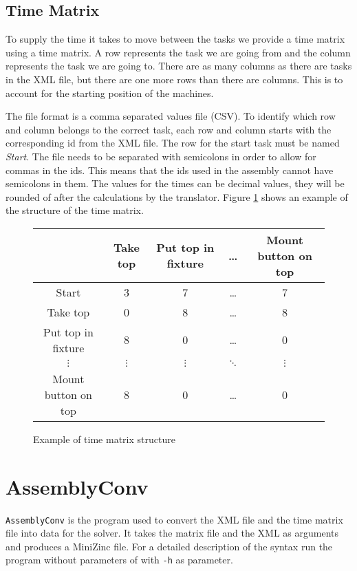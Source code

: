 \subsection{Time Matrix}\label{sec:time_matrix}
To supply the time it takes to move between the tasks we provide a time matrix using a time matrix. A row represents the task we are going from and the column represents the task we are going to. There are as many columns as there are tasks in the XML file, but there are one more rows than there are columns. This is to account for the starting position of the machines.

The file format is a comma separated values file (CSV). To identify which row and column belongs to the correct task, each row and column starts with the corresponding id from the XML file. The row for the start task must be named \emph{Start}. The file needs to be separated with semicolons in order to allow for commas in the ids. This means that the ids used in the assembly cannot have semicolons in them. The values for the times can be decimal values, they will be rounded of after the calculations by the translator. Figure \ref{fig:time_matrix} shows an example of the structure of the time matrix.

\begin{figure}[h]
\begin{tabular}{c|c|c|c|c}
& Take top & Put top in fixture & \dots & Mount button on top\\\hline
Start & 3 & 7 & \dots & 7\\\hline
Take top & 0 & 8 & \dots & 8\\\hline
Put top in fixture & 8 & 0 & \dots & 0\\\hline
$\vdots$ & $\vdots$ & $\vdots$ & $\ddots$ & $\vdots$\\\hline
Mount button on top & 8 & 0 & \dots & 0
\end{tabular}
\caption{Example of time matrix structure}
\label{fig:time_matrix}
\end{figure}

\section{AssemblyConv}\label{sec:assemblyConv}
\texttt{AssemblyConv} is the program used to convert the XML file and the time matrix file into data for the solver. It takes the matrix file and the XML as arguments and produces a MiniZinc file. For a detailed description of the syntax run the program without parameters of with \texttt{-h} as parameter.

